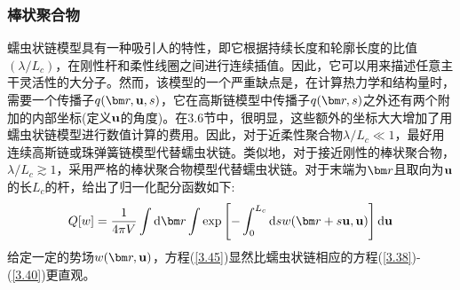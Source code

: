 \subsubsection{棒状聚合物}
蠕虫状链模型具有一种吸引人的特性，即它根据持续长度和轮廓长度的比值$(\lambda/L_c)$，在刚性杆和柔性线圈之间进行连续插值。因此，它可以用来描述任意主干灵活性的大分子。然而，该模型的一个严重缺点是，在计算热力学和结构量时，需要一个传播子$q(\br,\bu,s)$，它在高斯链模型中传播子$q(\br,s)$之外还有两个附加的内部坐标(定义$\mathbf{u}$的角度)。在3.6节中，很明显，这些额外的坐标大大增加了用蠕虫状链模型进行数值计算的费用。因此，对于近柔性聚合物$\lambda/L_c\ll 1$，最好用连续高斯链或珠弹簧链模型代替蠕虫状链。类似地，对于接近刚性的棒状聚合物，$\lambda/L_c\gtrsim 1$，采用严格的棒状聚合物模型代替蠕虫状链。对于末端为$\br$且取向为$\mathbf{u}$的长$L_c$的杆，给出了归一化配分函数如下:
\begin{equation}\label{3.45}
Q[w]=\frac{1}{4\pi V}\int\mathrm{d}\br\int\exp\left[-\int_0^{L_c}\mathrm{d}sw(\br+s\bu,\bu)\right]\mathrm{d}\bu
\end{equation}
给定一定的势场$w(\br,\bu)$，方程(\ref{3.45})显然比蠕虫状链相应的方程(\ref{3.38})-(\ref{3.40})更直观。










































































































